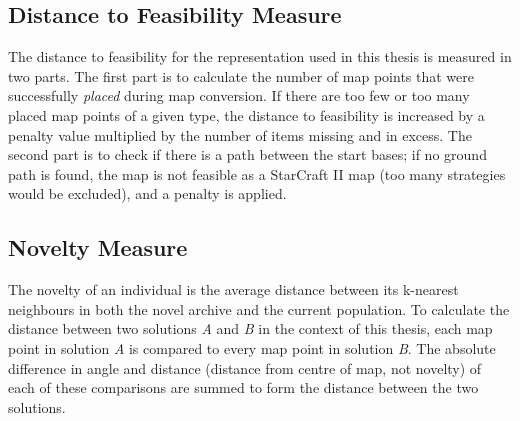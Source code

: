\subsection{Distance to Feasibility Measure}
\label{methodology_csn_distance}
The distance to feasibility for the representation used in this thesis is measured in two parts. The first part is to calculate the number of map points that were successfully \textit{placed} during map conversion. If there are too few or too many placed map points of a given type, the distance to feasibility is increased by a penalty value multiplied by the number of items missing and in excess. The second part is to check if there is a path between the start bases; if no ground path is found, the map is not feasible as a StarCraft II map (too many strategies would be excluded), and a penalty is applied.

\subsection{Novelty Measure}
\label{methodology_csn_measure}
The novelty of an individual is the average distance between its k-nearest neighbours in both the novel archive and the current population. To calculate the distance between two solutions \textit{A} and \textit{B} in the context of this thesis, each map point in solution \textit{A} is compared to every map point in solution \textit{B}. The absolute difference in angle and distance (distance from centre of map, not novelty) of each of these comparisons are summed to form the distance between the two solutions.